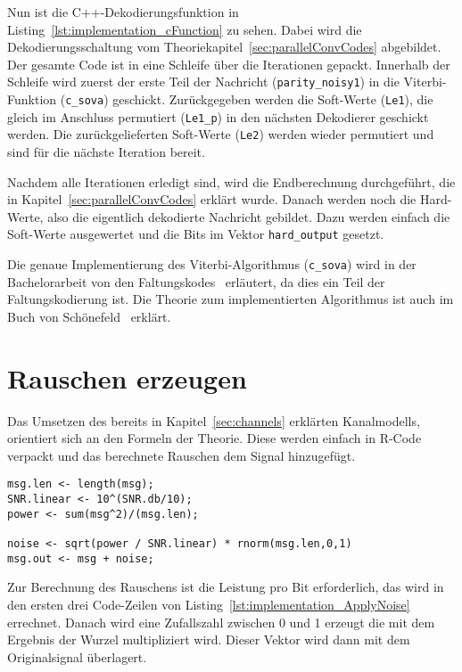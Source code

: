 Nun ist die C++-Dekodierungsfunktion in Listing~\ref{lst:implementation_cFunction} zu sehen. Dabei wird die Dekodierungsschaltung vom Theoriekapitel~\ref{sec:parallelConvCodes} abgebildet. Der gesamte Code ist in eine Schleife über die Iterationen gepackt. Innerhalb der Schleife wird zuerst der erste Teil der Nachricht (\texttt{parity\_noisy1}) in die Viterbi-Funktion (\texttt{c\_sova}) geschickt. Zurückgegeben werden die Soft-Werte (\texttt{Le1}), die gleich im Anschluss permutiert (\texttt{Le1\_p}) in den nächsten Dekodierer geschickt werden. Die zurückgelieferten Soft-Werte (\texttt{Le2}) werden wieder permutiert und sind für die nächste Iteration bereit.

Nachdem alle Iterationen erledigt sind, wird die Endberechnung durchgeführt, die in Kapitel~\ref{sec:parallelConvCodes} erklärt wurde. Danach werden noch die Hard-Werte, also die eigentlich dekodierte Nachricht gebildet. Dazu werden einfach die Soft-Werte ausgewertet und die Bits im Vektor \texttt{hard\_output} gesetzt.

Die genaue Implementierung des Viterbi-Algorithmus (\texttt{c\_sova}) wird in der Bachelorarbeit von den Faltungskodes~\cite[S.~27~ff.]{nocker} erläutert, da dies ein Teil der Faltungskodierung ist. Die Theorie zum implementierten Algorithmus ist auch im Buch von Schönefeld~\cite[222-233]{schoenfeld2012informations} erklärt.

\FloatBarrier
\section{Rauschen erzeugen}
\label{sec:implementation_applyNoise}
Das Umsetzen des bereits in Kapitel~\ref{sec:channels} erklärten Kanalmodells, orientiert sich an den Formeln der Theorie. Diese werden einfach in R-Code verpackt und das berechnete Rauschen dem Signal hinzugefügt.  

\begin{lstlisting}[caption=Implementierung von \texttt{ApplyNoise}, label={lst:implementation_ApplyNoise}, float=!th]
msg.len <- length(msg);
SNR.linear <- 10^(SNR.db/10);
power <- sum(msg^2)/(msg.len); 

noise <- sqrt(power / SNR.linear) * rnorm(msg.len,0,1)
msg.out <- msg + noise;
\end{lstlisting}

Zur Berechnung des Rauschens ist die Leistung pro Bit erforderlich, das wird in den ersten drei Code-Zeilen von Listing~\ref{lst:implementation_ApplyNoise} errechnet. Danach wird eine Zufallszahl zwischen 0 und 1 erzeugt die mit dem Ergebnis der Wurzel multipliziert wird. Dieser Vektor wird dann mit dem Originalsignal überlagert.

